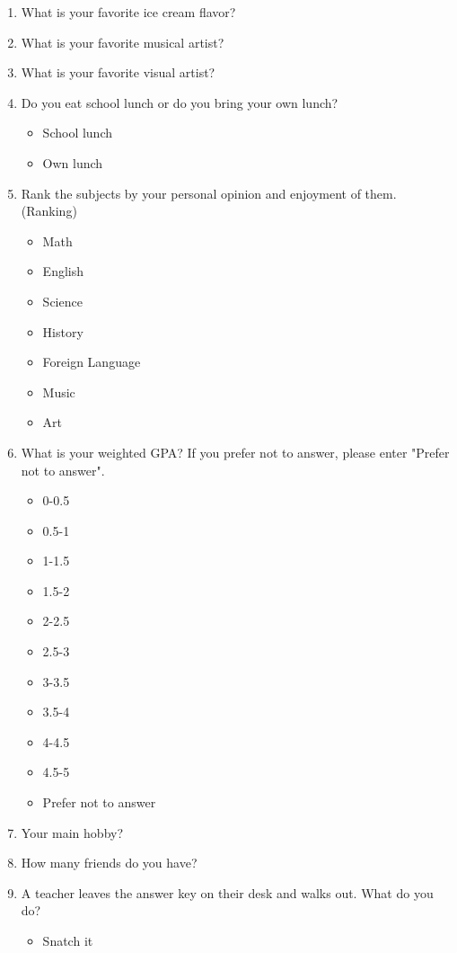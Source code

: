 \documentclass[12pt, letterpaper]{article}
\begin{document}
\begin{enumerate}
    \item What is your favorite ice cream flavor?
    \item What is your favorite musical artist?
    \item What is your favorite visual artist?
    \item Do you eat school lunch or do you bring your own lunch?
    \begin{itemize}
        \item School lunch
        \item Own lunch
    \end{itemize}
    \item Rank the subjects by your personal opinion and enjoyment of them. (Ranking)
    \begin{itemize}
        \item Math
        \item English
        \item Science
        \item History
        \item Foreign Language
        \item Music
        \item Art
    \end{itemize}
    \item What is your weighted GPA? If you prefer not to answer, please enter "Prefer not to answer".
    \begin{itemize}
        \item 0-0.5
        \item 0.5-1
        \item 1-1.5
        \item 1.5-2
        \item 2-2.5
        \item 2.5-3
        \item 3-3.5
        \item 3.5-4
        \item 4-4.5
        \item 4.5-5
        \item Prefer not to answer
    \end{itemize}
    \item Your main hobby?
    \item How many friends do you have?
    \item A teacher leaves the answer key on their desk and walks out. What do you do?
    \begin{itemize}
        \item Snatch it

\end{itemize}
\end{enumerate}
\end{document}
